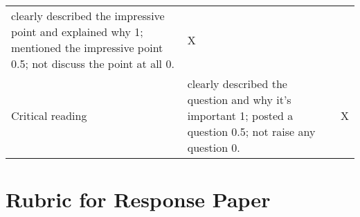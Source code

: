 \documentclass[11pt,]{article}
\theoremstyle{definition}
\theoremstyle{definition}
\theoremstyle{remark}
\begin{document}
\begin{longtable}[]{@{}lll@{}}
\begin{minipage}[t]{0.72\columnwidth}
clearly described the impressive point and explained why 1; mentioned
the impressive point 0.5; not discuss the point at all 0.\strut
\end{minipage} & \begin{minipage}[t]{0.04\columnwidth}\raggedright\strut
X\strut
\end{minipage}\tabularnewline
\begin{minipage}[t]{0.16\columnwidth}\raggedright\strut
Critical reading\strut
\end{minipage} & \begin{minipage}[t]{0.72\columnwidth}\raggedright\strut
clearly described the question and why it's important 1; posted a
question 0.5; not raise any question 0.\strut
\end{minipage} & \begin{minipage}[t]{0.04\columnwidth}\raggedright\strut
X\strut
\end{minipage}\tabularnewline
\bottomrule
\end{longtable}

\section{Rubric for Response Paper}\label{rubric-for-response-paper}
\end{document}
